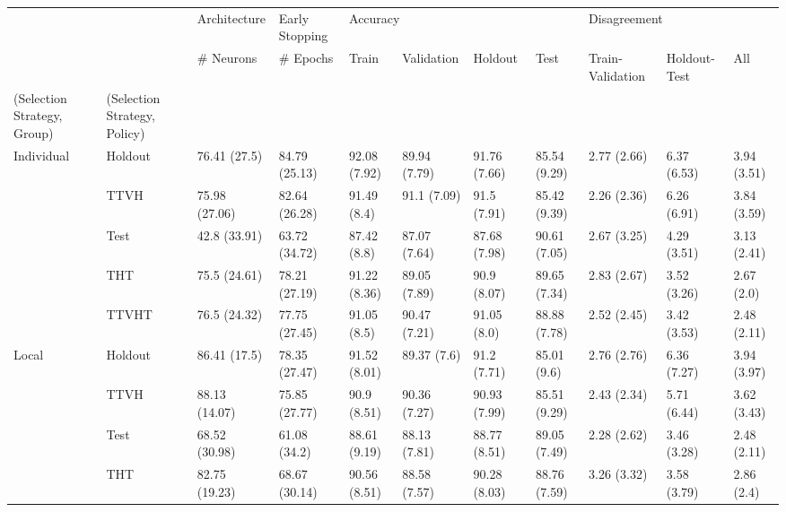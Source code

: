 \begin{table}
\centering
\label{tab:similar_sets_performance}
\begin{tabular}{lllllllllll}
\toprule
       &       &   Architecture & Early Stopping & \multicolumn{4}{l}{Accuracy} & \multicolumn{3}{l}{Disagreement} \\
       &       &      \# Neurons &       \# Epochs &          Train &    Validation &       Holdout &          Test & Train-Validation & Holdout-Test &          All \\
(Selection Strategy, Group) & (Selection Strategy, Policy) &                &                &                &               &               &               &                  &              &              \\
\midrule
Individual & Holdout &   76.41 (27.5) &  84.79 (25.13) &   92.08 (7.92) &  89.94 (7.79) &  91.76 (7.66) &  85.54 (9.29) &      2.77 (2.66) &  6.37 (6.53) &  3.94 (3.51) \\
       & TTVH &  75.98 (27.06) &  82.64 (26.28) &    91.49 (8.4) &   91.1 (7.09) &   91.5 (7.91) &  85.42 (9.39) &      2.26 (2.36) &  6.26 (6.91) &  3.84 (3.59) \\
       & Test &   42.8 (33.91) &  63.72 (34.72) &    87.42 (8.8) &  87.07 (7.64) &  87.68 (7.98) &  90.61 (7.05) &      2.67 (3.25) &  4.29 (3.51) &  3.13 (2.41) \\
       & THT &   75.5 (24.61) &  78.21 (27.19) &   91.22 (8.36) &  89.05 (7.89) &   90.9 (8.07) &  89.65 (7.34) &      2.83 (2.67) &  3.52 (3.26) &   2.67 (2.0) \\
       & TTVHT &   76.5 (24.32) &  77.75 (27.45) &    91.05 (8.5) &  90.47 (7.21) &   91.05 (8.0) &  88.88 (7.78) &      2.52 (2.45) &  3.42 (3.53) &  2.48 (2.11) \\
Local & Holdout &   86.41 (17.5) &  78.35 (27.47) &   91.52 (8.01) &   89.37 (7.6) &   91.2 (7.71) &   85.01 (9.6) &      2.76 (2.76) &  6.36 (7.27) &  3.94 (3.97) \\
       & TTVH &  88.13 (14.07) &  75.85 (27.77) &    90.9 (8.51) &  90.36 (7.27) &  90.93 (7.99) &  85.51 (9.29) &      2.43 (2.34) &  5.71 (6.44) &  3.62 (3.43) \\
       & Test &  68.52 (30.98) &   61.08 (34.2) &   88.61 (9.19) &  88.13 (7.81) &  88.77 (8.51) &  89.05 (7.49) &      2.28 (2.62) &  3.46 (3.28) &  2.48 (2.11) \\
       & THT &  82.75 (19.23) &  68.67 (30.14) &   90.56 (8.51) &  88.58 (7.57) &  90.28 (8.03) &  88.76 (7.59) &      3.26 (3.32) &  3.58 (3.79) &   2.86 (2.4) \\

\end{tabular}
\end{table}

